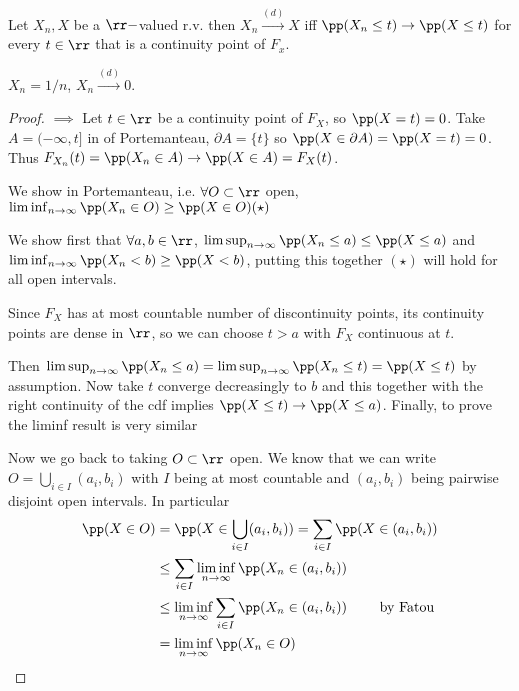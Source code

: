 \documentclass[../main.tex]{subfiles}
\begin{document}
\begin{theorem}
  Let $X_n, X$ be a $\rr-$valued r.v. then $X_n \overset{(d)}{\longrightarrow}
  X$ iff $\pp(X_n \leq t) \to \pp(X \leq t)$ for every $t \in \rr$ 
  that is a continuity point of $F_x$.
\end{theorem}
\begin{example}
  $X_n = 1/n$, $X_n \overset{(d)}{\longrightarrow} 0$.
\end{example}

\begin{proof}
  $\boxed{\implies}$ Let $t \in \rr$ be a continuity point of $F_X$, so $\pp(X =
  t)  = 0$. Take $A = (-\infty, t]$ in  of Portemanteau, $\partial A =
  \{ t \} $ so $\pp(X \in \partial A) =\pp(X = t) = 0$. Thus $F_{X_n}(t) =
  \pp(X_n \in A) \to \pp(X \in A) = F_X(t)$.

  \vspace{0.4em}
  \noindent
  \boxed{\impliedby} We show  in Portemanteau, i.e. $\forall O \subset
  \rr$ open, $\liminf_{n \to \infty} \pp(X_n \in O) \geq \pp(X \in O) (\star)$

  We show first that $\forall a, b \in \rr$, $\limsup_{n \to \infty} \pp(X_n
  \leq a) \leq \pp(X \leq a)$ and $\liminf_{n \to \infty} \pp(X_n < b) \geq \pp(X <
  b) $, putting this together $(\star)$ will hold for all open intervals.

  Since $F_X$ has at most countable number of discontinuity points, its
  continuity points are dense in $\rr$, so we can choose $t > a$ with $F_X$
  continuous at $t$. 

  Then $\limsup_{n \to \infty} \pp(X_n \leq a) = \limsup_{n \to \infty} \pp(X_n
  \leq t) = \pp(X \leq t)$ by assumption. Now take $t$ converge decreasingly to
  $b$ and this together with the right continuity of the cdf implies $\pp(X \leq
  t) \to \pp(X \leq a)$. Finally, to prove the liminf result is very similar 

  \vspace{0.4em}
  \noindent
  Now we go back to taking $O \subset \rr$ open. We know that we can write $O =
  \bigcup_{i \in I} (a_i, b_i)$ with $I$ being at most countable and $(a_i,
  b_i)$ being pairwise disjoint open intervals. In particular
  \begin{align*}
    \pp(X \in O)  &= \pp(X \in \bigcup_{i \in I} (a_i, b_i)) = \sum_{i \in I}
    \pp(X \in (a_i, b_i)) \\
    &\leq \sum_{i \in I} \liminf_{n \to \infty} \pp(X_n \in (a_i, b_i )) \\ 
    &\leq \liminf_{n \to \infty} \sum_{i \in I} \pp(X_n \in (a_i, b_i))
    \tag*{ by Fatou} \\
    &= \liminf_{n \to \infty} \pp(X_n \in O)
  \end{align*}
\end{proof}
\end{document}
